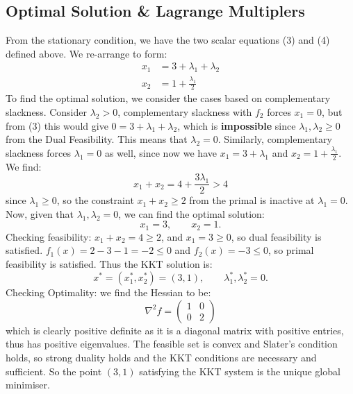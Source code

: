 \documentclass[12pt]{article}
\begin{document}
\subsection*{Optimal Solution \& Lagrange Multiplers}

From the stationary condition, we have the two scalar equations (3) and (4) defined above. We re-arrange to form: \begin{align*}
    x_{1} &= 3 + \lambda_1 + \lambda_2 \\
    x_{2} &= 1 + \frac{\lambda_1}{2}
\end{align*} To find the optimal solution, we consider the cases based on complementary slackness. Consider $\lambda_2 > 0$, complementary slackness with $f_{2}$ forces $x_{1} = 0$, but from (3) this would give $0 = 3 + \lambda_1 + \lambda_2$, which is \textbf{impossible} since $\lambda_1, \lambda_2 \geq 0$ from the Dual Feasibility. This means that $\lambda_2 = 0$. Similarly, complementary slackness forces $\lambda_1 = 0$ as well, since now we have $x_{1} = 3 + \lambda_1$ and $x_{2} = 1 + \frac{\lambda_1}{2}$. We find: \begin{equation*}
    x_{1} + x_{2} = 4 + \frac{3\lambda_1}{2} > 4 
\end{equation*} since $\lambda_1 \geq 0$, so the constraint $x_{1} + x_{2} \geq 2$ from the primal is inactive at $\lambda_1 = 0$. Now, given that $\lambda_1, \lambda_2 = 0$, we can find the optimal solution: \begin{equation*}
    x_{1} = 3, \qquad x_{2} = 1.
\end{equation*} Checking feasibility: $x_{1} + x_{2} = 4 \geq 2$, and $x_{1} = 3 \geq 0$, so dual feasibility is satisfied. $f_{1}(x) = 2 - 3 - 1 = -2 \leq 0$ and $f_{2}(x) = -3 \leq 0$, so primal feasibility is satisfied. Thus the KKT solution is: \begin{equation*}
    x^{*} = (x_{1}^{*}, x_{2}^{*}) = (3,1), \qquad \lambda_1^{*}, \lambda_2^{*} = 0.
\end{equation*} Checking Optimality: we find the Hessian to be: \begin{equation*}
    \nabla^2 f = \begin{pmatrix}
        1 & 0 \\ 
        0 & 2
    \end{pmatrix}
\end{equation*} which is clearly positive definite as it is a diagonal matrix with positive entries, thus has positive eigenvalues. The feasible set is convex and Slater's condition holds, so strong duality holds and the KKT conditions are necessary and sufficient. So the point $(3,1)$ satisfying the KKT system is the unique global minimiser. 
\end{document}
